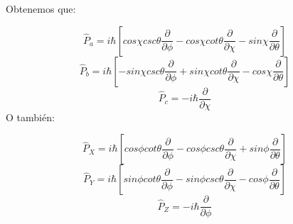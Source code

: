 \documentclass[a4paper]{article}
\begin{document}
Obtenemos que:

\begin{equation}
\hat P_a = i\hbar \left[cos\chi csc\theta \frac{\partial}{\partial \phi} - cos\chi cot\theta \frac{\partial}{\partial \chi} - sin\chi \frac{\partial}{\partial \theta} \right]
\end{equation}
\begin{equation}
\hat P_b = i\hbar \left[-sin\chi csc\theta \frac{\partial}{\partial \phi} + sin\chi cot\theta \frac{\partial}{\partial \chi} - cos\chi \frac{\partial}{\partial \theta} \right]
\end{equation}
\begin{equation}
\hat P_c = -i\hbar \frac{\partial}{\partial\chi}
\end{equation}
O también:

\begin{equation}
\hat P_X = i\hbar \left[cos\phi cot\theta \frac{\partial}{\partial \phi} - cos\phi csc\theta \frac{\partial}{\partial \chi} + sin\phi \frac{\partial}{\partial \theta} \right]
\end{equation}
\begin{equation}
\hat P_Y = i\hbar \left[sin\phi cot\theta \frac{\partial}{\partial \phi} - sin\phi csc\theta \frac{\partial}{\partial \chi} - cos\phi \frac{\partial}{\partial \theta} \right]
\end{equation}
\begin{equation}
\hat P_Z = -i\hbar\frac{\partial}{\partial\phi} 
\end{equation}
\end{document}

